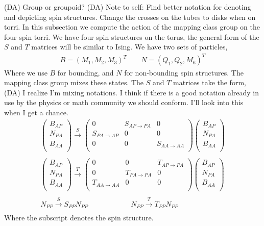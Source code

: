 \documentclass[12pt,a4paper]{article}
\newcounter{arrow}
\newcommand{\dave}[1]{{\color{ao(english)}\footnotesize{(DA) #1}}}
\begin{document}
\dave{Group or groupoid?}
\dave{Note to self: Find better notation for denoting and depicting spin structures. Change the crosses on the tubes to disks when on torri.}
In this subsection we compute the action of the mapping class group on the four spin torri. 
We have four spin structures on the torus, the general form of the $S$ and $T$ matrices will be similar to Ising. 
We have two sets of particles, 
\begin{align}
B = (M_1, M_2, M_3)^{T} \quad \quad N = (Q_1, Q_2, M_6)^{T}
\end{align}
Where we use $B$ for bounding, and $N$ for non-bounding spin structures.
The mapping class group mixes these states. 
The $S$ and $T$ matrices take the form,
\dave{I realize I'm mixing notations. I think if there is a good notation already in use by the physics or math community we should conform. I'll look into this when I get a chance.}
\begin{align}
\left(\begin{matrix}
B_{AP}\\
N_{PA} \\
B_{AA} \\
\end{matrix} \right)
\xrightarrow{S} \left( \begin{matrix}
0 & S_{AP \rightarrow PA} &0 \\
S_{PA \rightarrow AP} & 0 & 0 \\
0& 0 & S_{AA \rightarrow AA} \\
\end{matrix} \right)
\left(\begin{matrix}
B_{AP}\\
N_{PA} \\
B_{AA} \\
\end{matrix} \right)\\
\\
\left(\begin{matrix}
B_{AP}\\
N_{PA} \\
B_{AA} \\
\end{matrix} \right)
\xrightarrow{T} \left( \begin{matrix}
0 & 0 & T_{AP \rightarrow PA} \\
0 & T_{PA \rightarrow PA} & 0 \\
T_{AA \rightarrow AA} & 0 & 0 \\
\end{matrix} \right)
\left(\begin{matrix}
B_{AP}\\
N_{PA} \\
B_{AA} \\
\end{matrix} \right) \\
\\
N_{PP} \xrightarrow{S} S_{PP} N_{PP} \qquad\qquad\qquad  N_{PP} \xrightarrow{T} T_{PP} N_{PP} \\
\end{align}
Where the subscript denotes the spin structure. 
\end{document}
